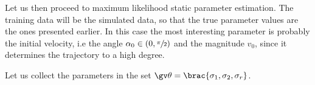 Let us then proceed to maximum likelihood static parameter estimation. The training
data will be the simulated data, so that the true parameter values are the ones presented
earlier. In this case the most interesting parameter is probably the initial velocity,
i.e the angle $\alpha_0\in(0,\sfrac{\pi}{2})$ and the magnitude $v_0$, since it determines
the trajectory to a high degree.

 
Let us collect the parameters in the set $\Th=\brac{\sigma_1,\sigma_2,\sigma_r}$.

\parencite{ristic2004beyond,Ratna2008,Lindsten2010}

 
